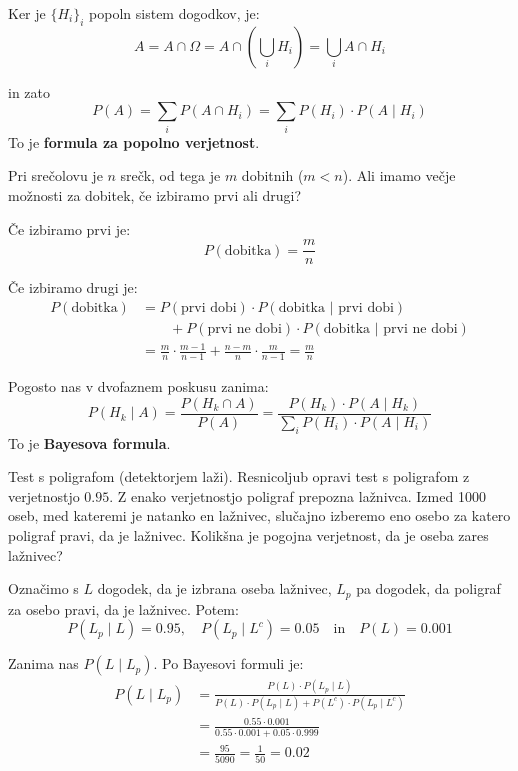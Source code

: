 \documentclass[12pt]{book}
\def\n{\noindent}
\theoremstyle{definition}
\theoremstyle{plain}
\theoremstyle{plain}
\theoremstyle{plain}
\theoremstyle{remark}
\begin{document}
Ker je $\{ H_i \}_i$ popoln sistem dogodkov, je:
$$
A=A \cap \Omega=A \cap\left(\bigcup_i H_i\right)=\bigcup_i A \cap H_i
$$

in zato
$$
P(A)=\sum_i P\left(A \cap H_i\right)=\sum_i P\left(H_i\right) \cdot P(A \mid H_i)
$$
To je \textbf{formula za popolno verjetnost}.

\begin{zgled}
    Pri srečolovu je $n$ srečk, od tega je $m$ dobitnih ($m<n$). Ali imamo večje možnosti za dobitek, če izbiramo prvi ali drugi?

    Če izbiramo prvi je:
    $$
    P(\text{dobitka}) = \frac{m}{n}
    $$

    Če izbiramo drugi je:
    $$
    \begin{aligned}
        P(\text{dobitka}) &= P(\text{prvi dobi}) \cdot P(\text{dobitka | prvi dobi}) \\
        & \qquad + P(\text{prvi ne dobi}) \cdot P(\text{dobitka | prvi ne dobi}) \\
        &= \frac{m}{n} \cdot \frac{m-1}{n-1}+\frac{n-m}{n} \cdot \frac{m}{n-1} =\frac{m}{n}
    \end{aligned}
    $$
\end{zgled}

\n Pogosto nas v dvofaznem poskusu  zanima: 
$$
P\left(H_k \mid A\right)=\frac{P\left(H_k \cap A\right)}{P(A)}=\frac{P\left(H_k\right) \cdot P\left(A \mid H_k\right)}{\sum_i P\left(H_i\right) \cdot P\left(A \mid H_i\right)}
$$
To je \textbf{Bayesova formula}.

\begin{zgled}
    Test s poligrafom (detektorjem laži). Resnicoljub opravi test s poligrafom z verjetnostjo $0.95$. Z enako verjetnostjo poligraf prepozna lažnivca. Izmed 1000 oseb, med kateremi je natanko en lažnivec, slučajno izberemo eno osebo za katero poligraf pravi, da je lažnivec. Kolikšna je pogojna verjetnost, da je oseba zares lažnivec?

    Označimo s $L$ dogodek, da je izbrana oseba lažnivec, $L_p$ pa dogodek, da poligraf za osebo pravi, da je lažnivec. Potem:
    $$
    P\left(L_p \mid L\right)=0.95, \quad  P\left(L_p \mid L^c\right)=0.05 \quad \text{in} \quad P(L)=0.001
    $$

    Zanima nas $P\left(L \mid L_p\right)$. Po Bayesovi formuli je:
    $$
    \begin{aligned}
        P\left(L \mid L_p\right)&=\frac{P(L) \cdot P\left(L_p \mid L\right)}{P(L) \cdot P\left(L_p \mid L\right)+P\left(L^c\right) \cdot P\left(L_p \mid L^c\right)} \\
        &=\frac{0.55 \cdot 0.001}{0.55 \cdot 0.001+0.05 \cdot 0.999} \\
        &=\frac{95}{5090} = \frac{1}{50} = 0.02 
    \end{aligned}
    $$
\end{zgled}
\end{document}
